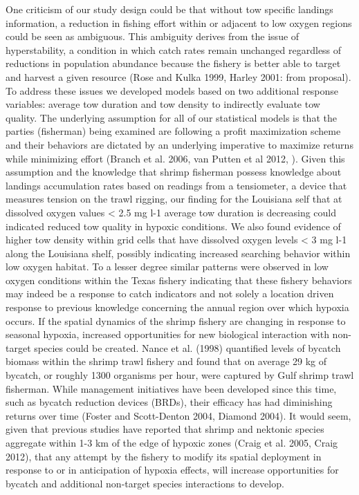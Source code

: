 \documentclass[10pt]{article}
\begin{document}
One criticism of our study design could be that without tow specific landings information, a reduction in fishing effort within or adjacent to low oxygen regions could be seen as ambiguous.  This ambiguity derives from the issue of hyperstability, a condition in which catch rates remain unchanged regardless of reductions in population abundance because the fishery is better able to target and harvest a given resource (Rose and Kulka 1999, Harley 2001: from proposal).  To address these issues we developed models based on two additional response variables: average tow duration and tow density to indirectly evaluate tow quality.  The underlying assumption for all of our statistical models is that the parties (fisherman) being examined are following a profit maximization scheme and their behaviors are dictated by an underlying imperative to maximize returns while minimizing effort (Branch et al. 2006, van Putten et al 2012, ).  Given this assumption and the knowledge that shrimp fisherman possess knowledge about landings accumulation rates based on readings from a tensiometer, a device that measures tension on the trawl rigging, our finding for the Louisiana self that at dissolved oxygen values < 2.5 mg l-1 average tow duration is decreasing could indicated reduced tow quality in hypoxic conditions.  We also found evidence of higher tow density within grid cells that have dissolved oxygen levels < 3 mg l-1 along the Louisiana shelf, possibly indicating increased searching behavior within low oxygen habitat.  To a lesser degree similar patterns were observed in low oxygen conditions within the Texas fishery indicating that these fishery behaviors may indeed be a response to catch indicators and not solely a location driven response to previous knowledge concerning the annual region over which hypoxia occurs.  
If the spatial dynamics of the shrimp fishery are changing in response to seasonal hypoxia, increased opportunities for new biological interaction with non-target species could be created.  Nance et al. (1998) quantified levels of bycatch biomass within the shrimp trawl fishery and found that on average 29 kg of bycatch, or roughly 1300 organisms per hour, were captured by Gulf shrimp trawl fisherman.  While management initiatives have been developed since this time, such as bycatch reduction devices (BRDs), their efficacy has had diminishing returns over time (Foster and Scott-Denton 2004, Diamond 2004).  It would seem, given that previous studies have reported that shrimp and nektonic species aggregate within 1-3 km of the edge of hypoxic zones (Craig et al. 2005, Craig 2012), that any attempt by the fishery to modify its spatial deployment in response to or in anticipation of hypoxia effects, will increase opportunities for bycatch and additional non-target species interactions to develop.  
\end{document}
